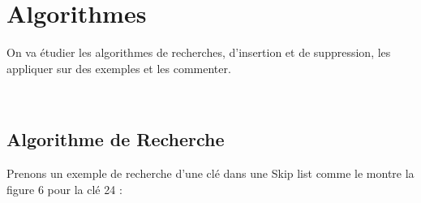 \documentclass[hidelinks,a4paper,12pt]{article}
\begin{document}
\section{Algorithmes}
On va étudier les algorithmes de recherches, d'insertion et de suppression, les appliquer sur des exemples et les commenter. 

~\\

\subsection{Algorithme de Recherche}
Prenons un exemple de recherche d'une clé dans une Skip list comme le montre la figure 6 pour la clé 24 :
\end{document}
